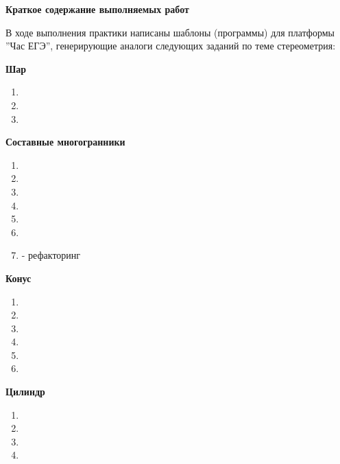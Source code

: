 \begin{center}
	\large\textbf{Краткое содержание выполняемых работ}\\
\end{center}

В ходе выполнения практики написаны шаблоны (программы) для платформы ”Час ЕГЭ”, генерирующие аналоги следующих заданий по теме стереометрия:

\textbf{Шар}

\begin{enumerate}
	\item {}
	\item {}
	\item {}
\end{enumerate}

\textbf{Составные многогранники}

\begin{enumerate}
	\item {}
	\item {}
	\item {}
	\item {}
	\item {}
	\item {}
	\item {} - рефакторинг
\end{enumerate}

\textbf{Конус}

\begin{enumerate}
	\item {}
	\item {}
	\item {}
	\item {}
	\item {}
	\item {}
\end{enumerate}

\textbf{Цилиндр}

\begin{enumerate}
	\item {}
	\item {}
	\item {}
	\item {}
\end{enumerate}

